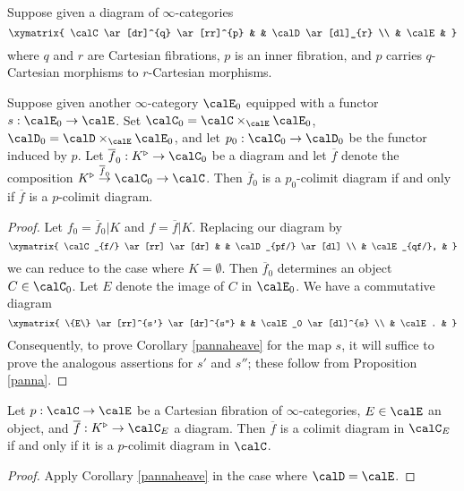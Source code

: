 \begin{corollary}\label{pannaheave}
Suppose given a diagram of $\infty$-categories
$$ \xymatrix{ \calC \ar[dr]^{q} \ar[rr]^{p} & & \calD \ar[dl]_{r} \\
& \calE & }$$
where $q$ and $r$ are Cartesian fibrations, $p$ is an inner fibration, and 
$p$ carries $q$-Cartesian morphisms to $r$-Cartesian morphisms.

Suppose given another $\infty$-category $\calE_0$ equipped with a functor
$s: \calE_0 \rightarrow \calE$. Set $\calC_0 = \calC \times_{\calE} \calE_0$,
$\calD_0 = \calD \times_{\calE} \calE_0$, and let $p_0: \calC_0 \rightarrow \calD_0$ be the functor induced by $p$.
Let $\overline{f}_0: K^{\triangleright} \rightarrow \calC_0$ be a diagram and let
$\overline{f}$ denote the composition $K^{\triangleright} \stackrel{\overline{f}_0}{\rightarrow}
\calC_0 \rightarrow \calC$. Then $\overline{f}_0$ is a $p_0$-colimit diagram if and only if
$\overline{f}$ is a $p$-colimit diagram.
\end{corollary}

\begin{proof}
Let $f_0 = \overline{f}_0 | K$ and $f = \overline{f} | K$. Replacing our diagram by
$$ \xymatrix{ \calC_{f/} \ar[rr] \ar[dr] & & \calD_{pf/} \ar[dl] \\
& \calE_{qf/}, & }$$
we can reduce to the case where $K = \emptyset$. Then $\overline{f}_0$ determines
an object $C \in \calC_0$. Let $E$ denote the image of $C$ in $\calE_0$. We have a commutative diagram
$$ \xymatrix{ \{E\} \ar[rr]^{s'} \ar[dr]^{s''} & & \calE_0 \ar[dl]^{s} \\
& \calE. & }$$
Consequently, to prove Corollary \ref{pannaheave} for the map $s$, it will suffice to prove the
analogous assertions for $s'$ and $s''$; these follow from Proposition \ref{panna}.
\end{proof}

\begin{corollary}\label{superduck}
Let $p: \calC \rightarrow \calE$ be a Cartesian fibration of $\infty$-categories, 
$E \in \calE$ an object, and $\overline{f}: K^{\triangleright} \rightarrow \calC_{E}$ a diagram.
Then $\overline{f}$ is a colimit diagram in $\calC_{E}$ if and only if
it is a $p$-colimit diagram in $\calC$.
\end{corollary}

\begin{proof}
Apply Corollary \ref{pannaheave} in the case where $\calD = \calE$.
\end{proof}

